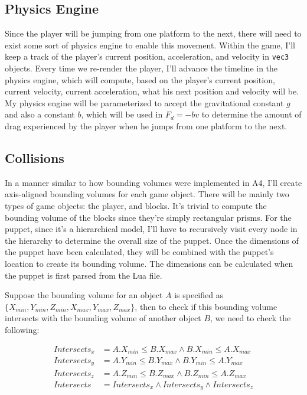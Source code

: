 \documentclass[11pt]{article}
\begin{document}
\subsection*{Physics Engine}
Since the player will be jumping from one platform to the next, there will need to exist some sort of physics engine to enable this movement. Within the game, I'll keep a track of the player's current position, acceleration, and velocity in \verb|vec3| objects. Every time we re-render the player, I'll advance the timeline in the physics engine, which will compute, based on the player's current position, current velocity, current acceleration, what his next position and velocity will be. My physics engine will be parameterized to accept the gravitational constant $g$ and also a constant $b$, which will be used in $F_d = -bv$ to determine the amount of drag experienced by the player when he jumps from one platform to the next.

\subsection*{Collisions}
In a manner similar to how bounding volumes were implemented in A4, I'll create axis-aligned bounding volumes for each game object. There will be mainly two types of game objects: the player, and blocks. It's trivial to compute the bounding volume of the blocks since they're simply rectangular prisms. For the puppet, since it's a hierarchical model, I'll have to recursively visit every node in the hierarchy to determine the overall size of the puppet. Once the dimensions of the puppet have been calculated, they will be combined with the puppet's location to create its bounding volume. The dimensions can be calculated when the puppet is first parsed from the Lua file.

Suppose the bounding volume for an object $A$ is specified as $\{X_{min}, Y_{min}, Z_{min}, X_{max}, Y_{max}, Z_{max}\}$, then to check if this bounding volume intersects with the bounding volume of another object $B$, we need to check the following:

\begin{align*}
Intersects_x &= A.X_{min} \leq B.X_{max} \land B.X_{min} \leq A.X_{max} \\
Intersects_y &= A.Y_{min} \leq B.Y_{max} \land B.Y_{min} \leq A.Y_{max} \\
Intersects_z &= A.Z_{min} \leq B.Z_{max} \land B.Z_{min} \leq A.Z_{max} \\
Intersects &= Intersects_x \land Intersects_y \land Intersects_z
\end{align*}
\end{document}
